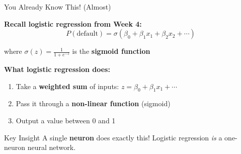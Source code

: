 \documentclass[10pt]{beamer}
\newcommand{\highlight}[1]{\textcolor{AccentOrange}{\textbf{#1}}}
\begin{document}
\begin{frame}{You Already Know This! (Almost)}

  \textbf{Recall logistic regression from Week 4:}
  \[
  P(\text{default}) = \sigma\left(\beta_0 + \beta_1 x_1 + \beta_2 x_2 + \cdots\right)
  \]

  where $\sigma(z) = \frac{1}{1 + e^{-z}}$ is the \highlight{sigmoid function}

  \vspace{1em}
  \textbf{What logistic regression does:}
  \begin{enumerate}
    \item Take a \textbf{weighted sum} of inputs: $z = \beta_0 + \beta_1 x_1 + \cdots$
    \item Pass it through a \textbf{non-linear function} (sigmoid)
    \item Output a value between 0 and 1
  \end{enumerate}

  \vspace{1em}
  \begin{block}{Key Insight}
    A single \highlight{neuron} does exactly this! Logistic regression \textit{is} a one-neuron neural network.
  \end{block}
\end{frame}

\end{document}
